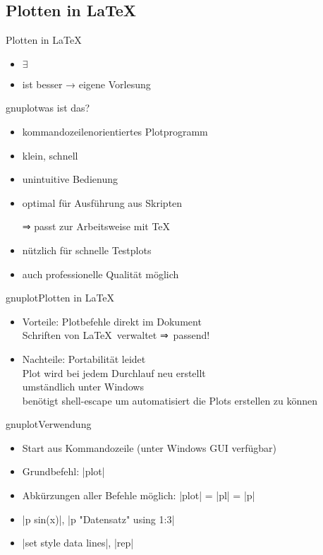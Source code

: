 \documentclass[
	vorläufig=false,
	datum=2022-11-02,
	titel={Mathematiksatz II},
	web=true,
	max,
	aspectratio=1610,
]{../tex/latexkurs-slides}
\begin{document}
\subsection{Plotten in \LaTeX}
\begin{frame}[fragile]{Plotten in \LaTeX}
\begin{itemize}
	\item $\exists$ 
	\item {} ist besser → eigene Vorlesung
\end{itemize}
\end{frame}

\begin{frame}{gnuplot}{was ist das?}
\begin{itemize}
\item kommandozeilenorientiertes Plotprogramm
\item klein, schnell
\item unintuitive Bedienung
\item optimal für Ausführung aus Skripten
\item[⇒] passt zur Arbeitsweise mit \TeX
\item nützlich für schnelle Testplots
\item auch professionelle Qualität möglich
\end{itemize}
\end{frame}

\begin{frame}{gnuplot}{Plotten in \LaTeX}
\begin{itemize}
\item {Vorteile}: Plotbefehle direkt im Dokument\\%
  Schriften von \LaTeX\ verwaltet ⇒  passend!
\item {Nachteile}: Portabilität leidet\\%
  Plot wird bei jedem Durchlauf neu erstellt\\%
  umständlich unter Windows\\%
  benötigt shell-escape um automatisiert die Plots erstellen zu können
\end{itemize}
\end{frame}

\begin{frame}[fragile]{gnuplot}{Verwendung}
\begin{itemize}
\item Start aus Kommandozeile (unter Windows GUI verfügbar)
\item Grundbefehl: |plot|
\item Abkürzungen aller Befehle möglich: |plot| = |pl| = |p|
\item |p sin(x)|, |p "Datensatz" using 1:3|
\item |set style data lines|, |rep|
\end{itemize}
\end{frame}
\end{document}
